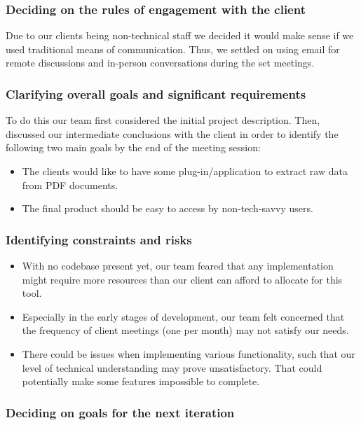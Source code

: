 \documentclass{l3proj}
\begin{document}
  \subsubsection{Deciding on the rules of engagement with the client} 
  
    Due to our clients being non-technical staff we decided it would make sense if we used traditional means of communication. Thus, we settled on using email for remote discussions and in-person conversations during the set meetings.
  \subsubsection{Clarifying overall goals and significant requirements}
  
  To do this our team first considered the initial project description. Then, discussed our intermediate conclusions with the client in order to identify the following two main goals by the end of the meeting session:
  \begin{itemize}
        \item The clients would like to have some plug-in/application to extract raw data from PDF documents. 
        \item The final product should be easy to access by non-tech-savvy users. 
     \end{itemize}
  
  \subsubsection{ Identifying constraints and risks}
    \begin{itemize}
        \item With no codebase present yet, our team feared that any implementation might require more resources than our client can afford to allocate for this tool.
        \item Especially in the early stages of development, our team felt concerned that the frequency of client meetings (one per month) may not satisfy our needs.
        \item There could be issues when implementing various functionality, such that our level of technical understanding may prove unsatisfactory. That could potentially make some features impossible to complete.
    \end{itemize}
  \subsubsection{Deciding on goals for the next iteration}
  
\end{document}
